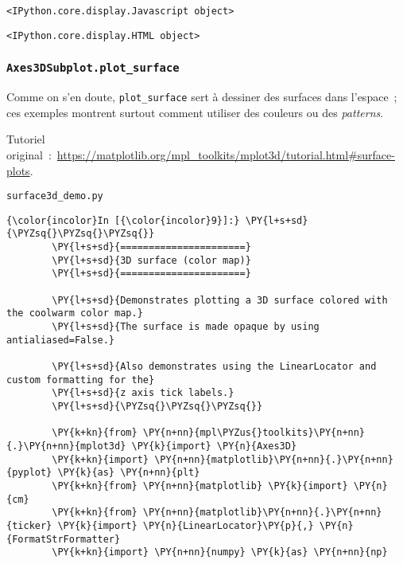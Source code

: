     
    \begin{verbatim}
<IPython.core.display.Javascript object>
    \end{verbatim}

    
    
    \begin{verbatim}
<IPython.core.display.HTML object>
    \end{verbatim}

    
    \hypertarget{axes3dsubplot.plot_surface}{%
\subsubsection{\texorpdfstring{\texttt{Axes3DSubplot.plot\_surface}}{Axes3DSubplot.plot\_surface}}\label{axes3dsubplot.plot_surface}}

    Comme on s'en doute, \texttt{plot\_surface} sert à dessiner des surfaces
dans l'espace~; ces exemples montrent surtout comment utiliser des
couleurs ou des \emph{patterns}.

    Tutoriel
original~:~\url{https://matplotlib.org/mpl_toolkits/mplot3d/tutorial.html\#surface-plots}.

    \texttt{surface3d\_demo.py}

    \begin{Verbatim}[commandchars=\\\{\}]
{\color{incolor}In [{\color{incolor}9}]:} \PY{l+s+sd}{\PYZsq{}\PYZsq{}\PYZsq{}}
        \PY{l+s+sd}{======================}
        \PY{l+s+sd}{3D surface (color map)}
        \PY{l+s+sd}{======================}
        
        \PY{l+s+sd}{Demonstrates plotting a 3D surface colored with the coolwarm color map.}
        \PY{l+s+sd}{The surface is made opaque by using antialiased=False.}
        
        \PY{l+s+sd}{Also demonstrates using the LinearLocator and custom formatting for the}
        \PY{l+s+sd}{z axis tick labels.}
        \PY{l+s+sd}{\PYZsq{}\PYZsq{}\PYZsq{}}
        
        \PY{k+kn}{from} \PY{n+nn}{mpl\PYZus{}toolkits}\PY{n+nn}{.}\PY{n+nn}{mplot3d} \PY{k}{import} \PY{n}{Axes3D}
        \PY{k+kn}{import} \PY{n+nn}{matplotlib}\PY{n+nn}{.}\PY{n+nn}{pyplot} \PY{k}{as} \PY{n+nn}{plt}
        \PY{k+kn}{from} \PY{n+nn}{matplotlib} \PY{k}{import} \PY{n}{cm}
        \PY{k+kn}{from} \PY{n+nn}{matplotlib}\PY{n+nn}{.}\PY{n+nn}{ticker} \PY{k}{import} \PY{n}{LinearLocator}\PY{p}{,} \PY{n}{FormatStrFormatter}
        \PY{k+kn}{import} \PY{n+nn}{numpy} \PY{k}{as} \PY{n+nn}{np}
\end{Verbatim}


